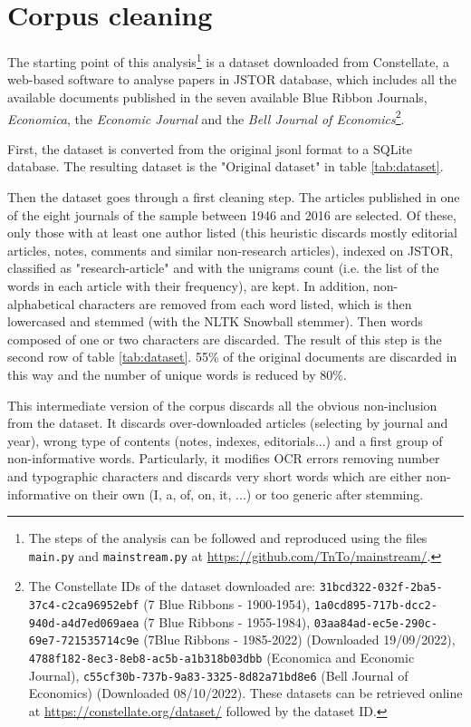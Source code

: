 \documentclass[a4paper, 11pt, headings=standardclasses, tablecaptionsbelow]{scrartcl}
\begin{document}
\section{Corpus cleaning}
The starting point of this analysis\footnote{The steps of the analysis can be followed and reproduced using the files \texttt{main.py} and \texttt{mainstream.py} at \url{https://github.com/TnTo/mainstream/}.} is a dataset downloaded from Constellate, a web-based software to analyse papers in JSTOR database, which includes all the available documents published in the seven available Blue Ribbon Journals, \textit{Economica}, the \textit{Economic Journal} and the \textit{Bell Journal of Economics}\footnote{The Constellate IDs of the dataset downloaded are: \texttt{31bcd322-032f-2ba5-37c4-c2ca96952ebf} (7 Blue Ribbons - 1900-1954), \texttt{1a0cd895-717b-dcc2-940d-a4d7ed069aea} (7 Blue Ribbons - 1955-1984), \texttt{03aa84ad-ec5e-290c-69e7-721535714c9e} (7Blue Ribbons - 1985-2022) (Downloaded 19/09/2022), \texttt{4788f182-8ec3-8eb8-ac5b-a1b318b03dbb} (Economica and Economic Journal), \texttt{c55cf30b-737b-9a83-3325-8d82a71bd8e6} (Bell Journal of Economics) (Downloaded 08/10/2022). These datasets can be retrieved online at \url{https://constellate.org/dataset/} followed by the dataset ID.}.



First, the dataset is converted from the original jsonl format to a SQLite database. The resulting dataset is the "Original dataset" in table \ref*{tab:dataset}.

Then the dataset goes through a first cleaning step. The articles published in one of the eight journals of the sample between 1946 and 2016 are selected. Of these, only those with at least one author listed (this heuristic discards mostly editorial articles, notes, comments and similar non-research articles), indexed on JSTOR, classified as "research-article" and with the unigrams count (i.e. the list of the words in each article with their frequency), are kept. In addition, non-alphabetical characters are removed from each word listed, which is then lowercased and stemmed (with the NLTK Snowball stemmer). Then words composed of one or two characters are discarded.
The result of this step is the second row of table \ref{tab:dataset}.
55\% of the original documents are discarded in this way and the number of unique words is reduced by 80\%.

This intermediate version of the corpus discards all the obvious non-inclusion from the dataset. It discards over-downloaded articles (selecting by journal and year), wrong type of contents (notes, indexes, editorials...) and a first group of non-informative words. Particularly, it modifies OCR errors removing number and typographic characters and discards very short words which are either non-informative on their own (I, a, of, on, it, ...) or too generic after stemming.
\end{document}
